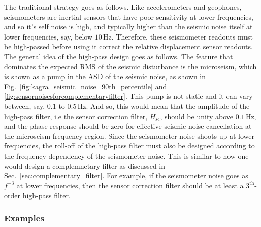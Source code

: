 The traditional strategy goes as follows.
Like accelerometers and geophones, seismometers are inertial sensors that have poor sensitivity at lower frequencies, and so it's self noise is high, and typically higher than the seismic noise itself at lower frequencies, say, below $10\,\mathrm{Hz}$.
Therefore, these seismometer readouts must be high-passed before using it correct the relative displacement sensor readouts.
The general idea of the high-pass design goes as follows.
The feature that dominates the expected RMS of the seismic disturbance is the microseism, which is shown as a pump in the ASD of the seismic noise, as shown in Fig.~\ref{fig:kagra_seismic_noise_90th_percentile} and \ref{fig:sensornoisesforcomplementaryfilter}.
This pump is not static and it can vary between, say, $0.1$ to $0.5\,\mathrm{Hz}$.
And so, this would mean that the amplitude of the high-pass filter, i.e the sensor correction filter, $H_\mathrm{sc}$, should be unity above $0.1\,\mathrm{Hz}$, and the phase response should be zero for effective seismic noise cancellation at the microseism frequency region.
Since the seismometer noise shoots up at lower frequencies, the roll-off of the high-pass filter must also be designed according to the frequency dependency of the seismometer noise.
This is similar to how one would design a complemnetary filter as discussed in Sec.~\ref{sec:complementary_filter}.
For example, if the seismometer noise goes as $f^{-3}$ at lower frequencies, then the sensor correction filter should be at least a $3^\mathrm{th}$-order high-pass filter.
 




\subsubsection{Examples \label{sec:sensor_fusion_examples}}